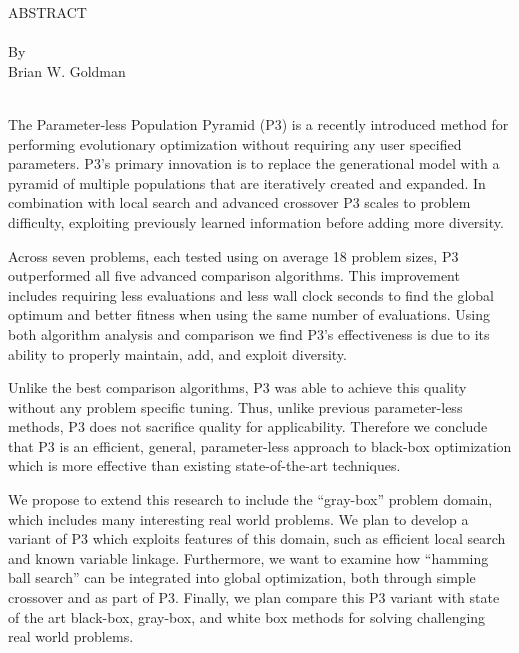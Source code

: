 \thispagestyle{empty} \setcounter{page}{2}
\begin{doublespace}
\begin{centering}
ABSTRACT\\ %
\MyTitle\\ %
By \\ %
Brian W. Goldman\\ %
\ \\
\end{centering}

The Parameter-less Population Pyramid (P3) is a recently introduced method for performing
evolutionary optimization without requiring any user specified parameters.
P3's primary innovation is to replace the generational model with a pyramid of
multiple populations that are iteratively created and expanded. In combination
with local search and advanced crossover P3 scales to problem difficulty, exploiting
previously learned information before adding more diversity.

Across seven problems, each tested using on average 18 problem sizes, P3 outperformed
all five advanced comparison algorithms. This improvement includes requiring less evaluations
and less wall clock seconds to find the global optimum and better fitness when using
the same number of evaluations. Using both algorithm analysis and comparison we find P3's
effectiveness is due to its ability to properly maintain, add, and exploit diversity.

Unlike the best comparison algorithms, P3 was able to achieve this quality without any
problem specific tuning. Thus, unlike previous parameter-less methods, P3 does not
sacrifice quality for applicability. Therefore we conclude that
P3 is an efficient, general, parameter-less approach to black-box
optimization which is more effective than existing state-of-the-art techniques.

We propose to extend this research to include the ``gray-box'' problem domain, which includes many
interesting real world problems. We plan to develop a variant of P3 which exploits
features of this domain, such as efficient local search and known variable linkage.
Furthermore, we want to examine how ``hamming ball search'' can be integrated into
global optimization, both through simple crossover and as part of P3.
Finally, we plan compare this P3 variant with state of the art black-box, gray-box, and
white box methods for solving challenging real world problems.
\end{doublespace}
\newpage
